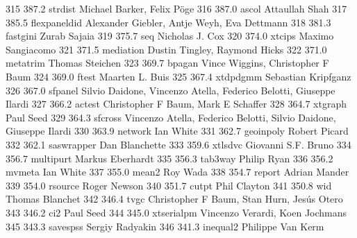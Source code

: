    315    387.2    strdist       Michael Barker, Felix Pöge             
   316    387.0    ascol         Attaullah Shah                          
   317    385.5    flexpaneldid  Alexander Giebler, Antje Weyh, Eva      
                                   Dettmann                                
   318    381.3    fastgini      Zurab Sajaia                            
   319    375.7    seq           Nicholas J. Cox                         
   320    374.0    xtcips        Maximo Sangiacomo                       
   321    371.5    mediation     Dustin Tingley, Raymond Hicks           
   322    371.0    metatrim      Thomas Steichen                         
   323    369.7    bpagan        Vince Wiggins, Christopher F Baum       
   324    369.0    ftest         Maarten L. Buis                         
   325    367.4    xtdpdgmm      Sebastian Kripfganz                     
   326    367.0    sfpanel       Silvio Daidone, Vincenzo Atella,        
                                   Federico Belotti, Giuseppe Ilardi       
   327    366.2    actest        Christopher F Baum, Mark E Schaffer     
   328    364.7    xtgraph       Paul Seed                               
   329    364.3    sfcross       Vincenzo Atella, Federico Belotti,      
                                   Silvio Daidone, Giuseppe Ilardi         
   330    363.9    network       Ian White                               
   331    362.7    geoinpoly     Robert Picard                           
   332    362.1    saswrapper    Dan Blanchette                          
   333    359.6    xtlsdvc       Giovanni S.F. Bruno                     
   334    356.7    multipurt     Markus Eberhardt                        
   335    356.3    tab3way       Philip Ryan                             
   336    356.2    mvmeta        Ian White                               
   337    355.0    mean2         Roy Wada                                
   338    354.7    report        Adrian Mander                           
   339    354.0    rsource       Roger Newson                            
   340    351.7    cutpt         Phil Clayton                            
   341    350.8    wid           Thomas Blanchet                         
   342    346.4    tvgc          Christopher F Baum, Stan Hurn, Jesús   
                                   Otero                                   
   343    346.2    ci2           Paul Seed                               
   344    345.0    xtserialpm    Vincenzo Verardi, Koen Jochmans         
   345    343.3    savespss      Sergiy Radyakin                         
   346    341.3    inequal2      Philippe Van Kerm                       
